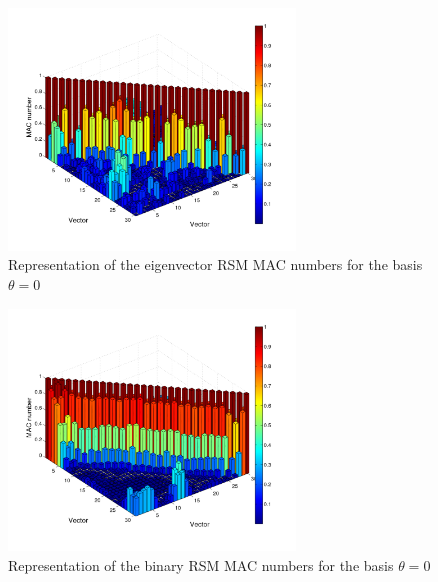 \documentclass[3p,times]{elsarticle}
\begin{document}
\begin{figure}[ht!]
\includegraphics[width={3.0in}]{../figs/EVMAC.pdf}
\centering
\caption{Representation of the eigenvector RSM MAC numbers for the basis $\theta=0$}
\label{fig:EMAC}
\end{figure}
\begin{figure}[ht!]
\includegraphics[width={3.0in}]{../figs/BiMAC.pdf}
\centering
\caption{Representation of the binary RSM MAC numbers for the basis $\theta=0$}
\label{fig:BMAC}
\end{figure}
\end{document}
